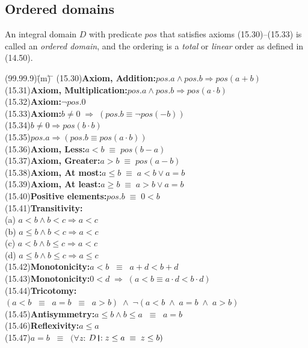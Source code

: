 \documentclass{amsart}
\newcommand{\lgap}{2pt}                             %
\newcommand{\llgap}{6pt}                            %
\newcommand{\equivs}{\ensuremath{\;\equiv\;}}       %
\newcommand{\equivss}{\ensuremath{\;\;\equiv\;\;}}  %
\newcommand{\impl}{\ensuremath{\Rightarrow}}        %
\newcommand{\thedr}{\rule[-.25ex]{.32mm}{1.75ex}}   %
\newcommand{\drrb}{\;\thedr\,{:}\;}                 %
\newcommand{\all}{\forall}                          %
\begin{document}
\subsection*{Ordered domains}
An integral domain $D$ with predicate $pos$ that satisfies axioms (15.30)--(15.33) is called an
\emph{ordered domain}, and the ordering is a \emph{total} or \emph{linear} order as defined in (14.50).
\begin{tabbing}
(99.99.9)\;\=(m)\;\= \makebox[2in]{ } \= \kill
(15.30)\>\textbf{Axiom, Addition:}\quad $pos.a \land pos.b \impl pos(a + b)$\\[\lgap]
(15.31)\>\textbf{Axiom, Multiplication:}\quad $pos.a \land pos.b \impl pos(a \cdot b)$\\[\lgap]
(15.32)\>\textbf{Axiom:}\quad $\neg pos.0$\\[\lgap]
(15.33)\>\textbf{Axiom:}\quad $b \ne 0 \;\impl\; (pos.b \equiv \neg pos(-b))$\\[\llgap]
(15.34)\>$b \ne 0 \impl pos(b \cdot b)$\\[\lgap]
(15.35)\>$pos.a \impl (pos.b \equiv pos(a \cdot b))$\\[\llgap]
(15.36)\>\textbf{Axiom, Less:}\quad $a < b \equivs pos(b - a)$\\[\lgap]
(15.37)\>\textbf{Axiom, Greater:}\quad $a > b \equivs pos(a - b)$\\[\lgap]
(15.38)\>\textbf{Axiom, At most:}\quad $a \le b \equivs a < b \lor a = b$\\[\lgap]
(15.39)\>\textbf{Axiom, At least:}\quad $a \ge b \equivs a > b \lor a = b$\\[\llgap]
(15.40)\>\textbf{Positive elements:}\quad $pos.b \equivs 0 < b$\\[\lgap]
(15.41)\>\textbf{Transitivity:}\\[\lgap]
       \>(a)\> $a < b \land b < c \impl a < c$\\[\lgap]
       \>(b)\> $a \le b \land b < c \impl a < c$\\[\lgap]
       \>(c)\> $a < b \land b \le c \impl a < c$\\[\lgap]
       \>(d)\> $a \le b \land b \le c \impl a \le c$\\[\lgap]
(15.42)\>\textbf{Monotonicity:}\quad $a < b \equivss a + d < b + d$\\[\lgap]
(15.43)\>\textbf{Monotonicity:}\quad $0 < d \;\impl\; (a < b \equiv a \cdot d < b \cdot d)$\\[\lgap]
(15.44)\>\textbf{Tricotomy:}\quad $(a < b \equivss a = b \equivss a > b) \;\land\; \neg (a < b \;\land\; a = b \;\land\; a > b)$\\[\lgap]
(15.45)\>\textbf{Antisymmetry:}\quad $a \le b \land b \le a \equivss a = b$\\[\lgap]
(15.46)\>\textbf{Reflexivity:}\quad $a \le a$\\[\lgap]
(15.47)\>$a = b \equivss (\all z$: $D \drrb z \le a \equivs z \le b)$\\[\lgap]
\end{tabbing}
\end{document}
